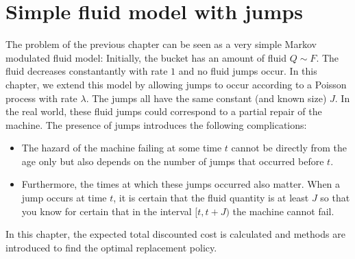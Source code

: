 \chapter{Simple fluid model with jumps}\label{chapter:SimpleFluid}
The problem of the previous chapter can be seen as a very simple Markov modulated fluid model:
Initially, the bucket has an amount of fluid $Q\sim F$.
The fluid decreases constantantly with rate $1$ and no fluid jumps occur.
In this chapter, we extend this model by allowing jumps to occur according to a Poisson process with rate $\lambda$.
The jumps all have the same constant (and known size) $J$.
In the real world, these fluid jumps could correspond to a partial repair of the machine.
The presence of jumps introduces the following complications:
\begin{itemize}
	\item The hazard of the machine failing at some time $t$ cannot be directly from the age only but also depends on the number of jumps that occurred before $t$.
	\item Furthermore, the times at which these jumps occurred also matter.
	When a jump occurs at time $t$, it is certain that the fluid quantity is at least $J$ so that you know for certain that in the interval $[t,t+J)$ the machine cannot fail.
\end{itemize}
In this chapter, the expected total discounted cost is calculated and methods are introduced to find the optimal replacement policy.







